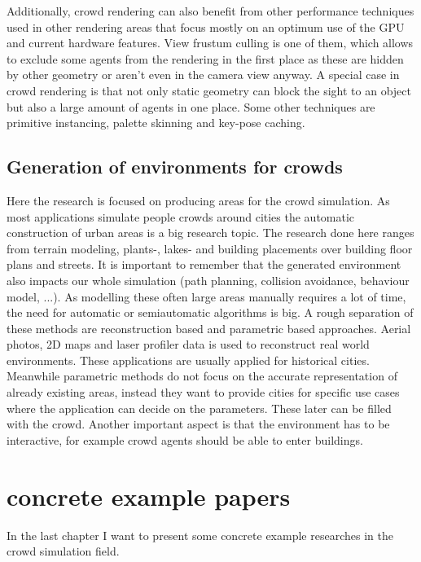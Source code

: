 \documentclass{acmsiggraph}               %
\begin{document}
Additionally, crowd rendering can also benefit from other performance techniques used in other rendering areas that focus mostly on an optimum use of the GPU and current hardware features. View frustum culling is one of them, which allows to exclude some agents from the rendering in the first place as these are hidden by other geometry or aren't even in the camera view anyway. A special case in crowd rendering is that not only static geometry can block the sight to an object but also a large amount of agents in one place. Some other techniques are primitive instancing, palette skinning and key-pose caching.     
\cite{beacco_survey_2016}

\cite{thalmann_crowd_2013}

\subsection{Generation of environments for crowds}

Here the research is focused on producing areas for the crowd simulation. As most applications simulate people crowds around cities the automatic construction of urban areas is a big research topic. The research done here ranges from terrain modeling, plants-, lakes- and building placements over building floor plans and streets. It is important to remember that the generated environment also impacts our whole simulation (path planning, collision avoidance, behaviour model, ...). 
As modelling these often large areas manually requires a lot of time, the need for automatic or semiautomatic algorithms is big. A rough separation of these methods are reconstruction based and parametric based approaches. 
Aerial photos, 2D maps and laser profiler data is used to reconstruct real world environments. These applications are usually applied for historical cities. 
Meanwhile parametric methods do not focus on the accurate representation of already existing areas, instead they want to provide cities for specific use cases where the application can decide on the parameters. These later can be filled with the crowd. Another important aspect is that the environment has to be interactive, for example  crowd agents should be able to enter buildings.
\cite{thalmann_crowd_2013}

\section{concrete example papers}

In the last chapter I want to present some concrete example researches in the crowd simulation field. 
\end{document}
